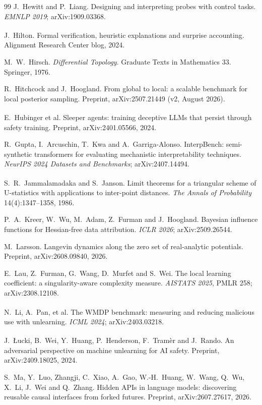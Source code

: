 \documentclass[11pt,a4paper]{article}
\newcommand{\unv}{\textsuperscript{\dag}}
\begin{document}
\begin{thebibliography}{99}
 J.~Hewitt and P.~Liang. Designing and
interpreting probes with control tasks. \emph{EMNLP 2019};
arXiv:1909.03368.

\unv{} J.~Hilton. Formal verification, heuristic
explanations and surprise accounting. Alignment Research Center blog,
2024.

 M.~W.~Hirsch. \emph{Differential Topology}. Graduate
Texts in Mathematics 33. Springer, 1976.

 R.~Hitchcock and J.~Hoogland. From global to local:
a scalable benchmark for local posterior sampling. Preprint,
arXiv:2507.21449 (v2, August 2026).

\unv{} E.~Hubinger et al. Sleeper agents: training
deceptive LLMs that persist through safety training. Preprint,
arXiv:2401.05566, 2024.

 R.~Gupta, I.~Arcuschin, T.~Kwa and
A.~Garriga-Alonso. InterpBench: semi-synthetic transformers for evaluating
mechanistic interpretability techniques. \emph{NeurIPS 2024 Datasets and
Benchmarks}; arXiv:2407.14494.

\unv{} S.~R.~Jammalamadaka and S.~Janson. Limit
theorems for a triangular scheme of U-statistics with applications to
inter-point distances. \emph{The Annals of Probability} 14(4):1347--1358,
1986.

 P.~A.~Kreer, W.~Wu, M.~Adam, Z.~Furman and J.~Hoogland.
Bayesian influence functions for Hessian-free data attribution.
\emph{ICLR 2026}; arXiv:2509.26544.

 M.~Larsson. Langevin dynamics along the zero set of
real-analytic potentials. Preprint, arXiv:2608.09840, 2026.

 E.~Lau, Z.~Furman, G.~Wang, D.~Murfet and S.~Wei. The
local learning coefficient: a singularity-aware complexity measure.
\emph{AISTATS 2025}, PMLR 258; arXiv:2308.12108.

\unv{} N.~Li, A.~Pan, et al. The WMDP benchmark:
measuring and reducing malicious use with unlearning. \emph{ICML 2024};
arXiv:2403.03218.

\unv{} J.~\L{}ucki, B.~Wei, Y.~Huang, P.~Henderson,
F.~Tram\`er and J.~Rando. An adversarial perspective on machine
unlearning for AI safety. Preprint, arXiv:2409.18025, 2024.

 S.~Ma, Y.~Luo, Zhangji, C.~Xiao, A.~Gao, W.-H.~Huang, W.~Wang,
Q.~Wu, X.~Li, J.~Wei and Q.~Zhang. Hidden APIs in language models:
discovering reusable causal interfaces from forked futures. Preprint,
arXiv:2607.27617, 2026.


\end{thebibliography}
\end{document}
